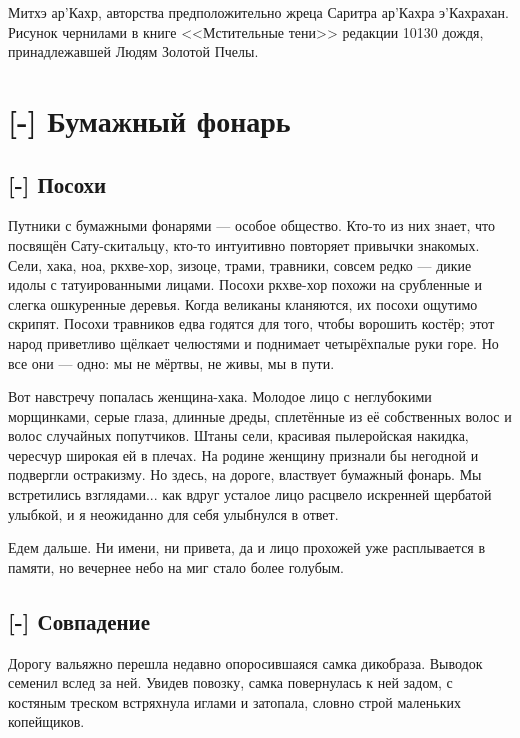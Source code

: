 
\newpage
\thispagestyle{plain}

Митхэ ар'Кахр, авторства предположительно жреца Саритра ар'Кахра э'Кахрахан.
Рисунок чернилами в книге <<Мстительные тени>> редакции 10130 дождя, принадлежавшей Людям Золотой Пчелы.

\chapter{[-] Бумажный фонарь}

\section{[-] Посохи}

Путники с бумажными фонарями --- особое общество.
Кто-то из них знает, что посвящён Сату-скитальцу, кто-то интуитивно повторяет привычки знакомых.
Сели, хака, ноа, ркхве-хор, зизоце, трами, травники, совсем редко --- дикие идолы с татуированными лицами.
Посохи ркхве-хор похожи на срубленные и слегка ошкуренные деревья.
Когда великаны кланяются, их посохи ощутимо скрипят.
Посохи травников едва годятся для того, чтобы ворошить костёр;
этот народ приветливо щёлкает челюстями и поднимает четырёхпалые руки горе.
Но все они --- одно: мы не мёртвы, не живы, мы в пути.

Вот навстречу попалась женщина-хака.
Молодое лицо с неглубокими морщинками, серые глаза, длинные дреды, сплетённые из её собственных волос и волос случайных попутчиков.
Штаны сели, красивая пылеройская накидка, чересчур широкая ей в плечах.
На родине женщину признали бы негодной и подвергли остракизму.
Но здесь, на дороге, властвует бумажный фонарь.
Мы встретились взглядами... как вдруг усталое лицо расцвело искренней щербатой улыбкой, и я неожиданно для себя улыбнулся в ответ.

Едем дальше.
Ни имени, ни привета, да и лицо прохожей уже расплывается в памяти, но вечернее небо на миг стало более голубым.

\section{[-] Совпадение}

\textspace

Дорогу вальяжно перешла недавно опоросившаяся самка дикобраза.
Выводок семенил вслед за ней.
Увидев повозку, самка повернулась к ней задом, с костяным треском встряхнула иглами и затопала, словно строй маленьких копейщиков.


